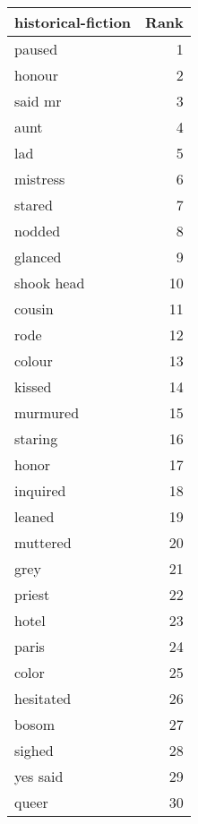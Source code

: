 \begin{table}
\label{tab:historical-fiction_terms}
\begin{tabular}{lr}
\toprule
historical-fiction & Rank \\
\midrule
paused & 1 \\
honour & 2 \\
said mr & 3 \\
aunt & 4 \\
lad & 5 \\
mistress & 6 \\
stared & 7 \\
nodded & 8 \\
glanced & 9 \\
shook head & 10 \\
cousin & 11 \\
rode & 12 \\
colour & 13 \\
kissed & 14 \\
murmured & 15 \\
staring & 16 \\
honor & 17 \\
inquired & 18 \\
leaned & 19 \\
muttered & 20 \\
grey & 21 \\
priest & 22 \\
hotel & 23 \\
paris & 24 \\
color & 25 \\
hesitated & 26 \\
bosom & 27 \\
sighed & 28 \\
yes said & 29 \\
queer & 30 \\
\bottomrule
\end{tabular}
\end{table}
